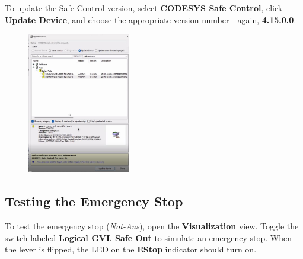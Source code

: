 \documentclass[a4paper,12pt]{article}
\begin{document}
To update the Safe Control version, select \textbf{CODESYS Safe Control}, click \textbf{Update Device}, and choose the appropriate version number—again, \textbf{4.15.0.0}.

\begin{figure}[H]
	\centering
	\includegraphics[width=0.4\textwidth]{c5.jpg}
\end{figure}

\subsection{Testing the Emergency Stop}

To test the emergency stop (\textit{Not-Aus}), open the \textbf{Visualization} view. Toggle the switch labeled \textbf{Logical GVL Safe Out} to simulate an emergency stop. When the lever is flipped, the LED on the \textbf{EStop} indicator should turn on.
\end{document}
